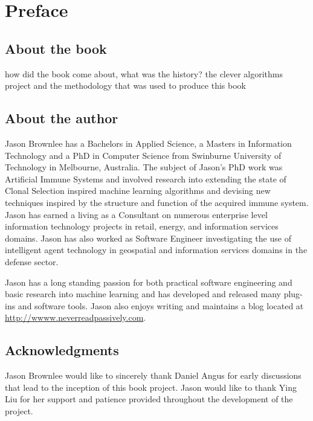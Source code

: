 

\chapter*{Preface}

\section*{About the book}
how did the book come about, what was the history?
the clever algorithms project and the methodology that was used to produce this book

% 
% 
\section*{About the author}
Jason Brownlee has a Bachelors in Applied Science, a Masters in Information Technology and a PhD in Computer Science from Swinburne University of Technology in Melbourne, Australia. The subject of Jason's PhD work was Artificial Immune Systems and involved research into extending the state of Clonal Selection inspired machine learning algorithms and devising new techniques inspired by the structure and function of the acquired immune system.
Jason has earned a living as a Consultant on numerous enterprise level information technology projects in retail, energy, and information services domains. Jason has also worked as Software Engineer investigating the use of intelligent agent technology in geospatial and information services domains in the defense sector.

Jason has a long standing passion for both practical software engineering and basic research into machine learning and has developed and released many plug-ins and software tools. Jason also enjoys writing and maintains a blog located at \url{http://wwww.neverreadpassively.com}. 

% 
% 
\section*{Acknowledgments}
Jason Brownlee would like to sincerely thank Daniel Angus for early discussions that lead to the inception of this book project.
Jason would like to thank Ying Liu for her support and patience provided throughout the development of the project. 